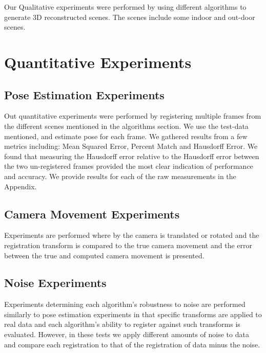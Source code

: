 Our Qualitative experiments were performed by using different algorithms to generate 3D reconstructed scenes. The scenes include some indoor and out-door scenes. 

\section{Quantitative Experiments}

\subsection{Pose Estimation Experiments}

Out quantitative experiments were performed by registering multiple frames from the different scenes mentioned in the algorithms section. We use the test-data mentioned, and estimate pose for each frame. We gathered results from a few metrics including: Mean Squared Error, Percent Match and Hausdorff Error. We found that measuring the Hausdorff error relative to the Hausdorff error between the two un-registered frames provided the most clear indication of performance and accuracy. We provide results for each of the raw measurements in the Appendix.


\subsection{Camera Movement Experiments}

Experiments are performed where by the camera is translated or rotated and the registration transform is compared to the true camera movement and the error between the true and computed camera movement is presented.



\subsection{Noise Experiments}

Experiments determining each algorithm's robustness to noise are performed similarly to pose estimation experiments in that specific transforms are applied to real data and each algorithm's ability to register against such transforms is evaluated. However, in these tests we apply different amounts of noise to data and compare each registration to that of the registration of data minus the noise.




